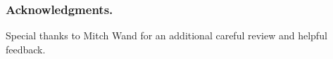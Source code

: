 \documentclass{llncs}
\begin{document}
\subsubsection*{Acknowledgments.} Special thanks to Mitch Wand for an additional careful review and helpful feedback.

\end{document}
